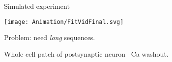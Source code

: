 \documentclass[final]{beamer}%
\begin{document}
\begin{frame}{Simulated experiment}
%
 \begin{center}
   \texttt{[image: Animation/FitVidFinal.svg]}
 \end{center}
 Problem: need \emph{long} sequences.

 Whole cell patch of postsynaptic neuron \lto\ Ca washout.
%
%
%
%
%

%
\end{frame}


%
%
\end{document}
